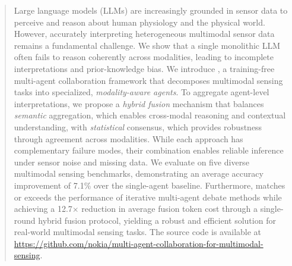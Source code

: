 \begin{abstract}
\label{sec:abstract}

Large language models (LLMs) are increasingly grounded in sensor data to perceive and reason about human physiology and the physical world. However, accurately interpreting heterogeneous multimodal sensor data remains a fundamental challenge. We show that a single monolithic LLM often fails to reason coherently across modalities, leading to incomplete interpretations and  prior-knowledge bias. We introduce \textbf{\system{}}, a training-free multi-agent collaboration framework that decomposes multimodal sensing tasks into specialized, \textit{modality-aware agents}. To aggregate agent-level interpretations, we propose a \textit{hybrid fusion} mechanism that balances \textit{semantic} aggregation, which enables cross-modal reasoning and contextual understanding, with \textit{statistical} consensus, which provides robustness through agreement across modalities. While each approach has complementary failure modes, their combination enables reliable inference under sensor noise and missing data. We evaluate \system{} on five diverse multimodal sensing benchmarks, demonstrating an average accuracy improvement of 7.1\% over the single-agent baseline. Furthermore, \system{} matches or exceeds the performance of iterative multi-agent debate methods while achieving a 12.7$\times$ reduction in average fusion token cost through a single-round hybrid fusion protocol, yielding a robust and efficient solution for real-world multimodal sensing tasks. The source code is available at \url{https://github.com/nokia/multi-agent-collaboration-for-multimodal-sensing}.

\end{abstract}